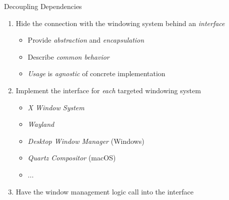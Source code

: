 \begin{secframe}{Decoupling Dependencies}


    \begin{enumerate}

        \item Hide the connection with the windowing system behind an \textit{interface}\\
            \begin{itemize}
                \item Provide \textit{abstraction} and \textit{encapsulation}
                \item Describe \textit{common behavior}
                \item \textit{Usage} is \textit{agnostic} of concrete implementation
            \end{itemize}

        \item Implement the interface for \textit{each} targeted windowing system\\
            \begin{itemize}
                \item \textit{X Window System}
                \item \textit{Wayland}
                \item \textit{Desktop Window Manager} (Windows)
                \item \textit{Quartz Compositor} (macOS)
                \item ...
            \end{itemize}

        \item Have the window management logic call into the interface\\

    \end{enumerate}

    \vfill

\end{secframe}

